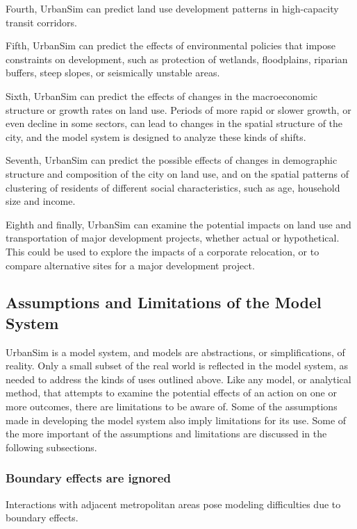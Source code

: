 Fourth, UrbanSim can predict land use development patterns in high-capacity transit corridors.

Fifth, UrbanSim can predict the effects of environmental policies that impose constraints on development, such as protection of wetlands, floodplains, riparian buffers, steep slopes, or seismically unstable areas.

Sixth, UrbanSim can predict the effects of changes in the macroeconomic structure or growth rates on land use. Periods of more rapid or slower growth, or even decline in some sectors, can lead to changes in the spatial structure of the city, and the model system is designed to analyze these kinds of shifts.

Seventh, UrbanSim can predict the possible effects of changes in demographic structure and composition of the city on land use, and on the spatial patterns of clustering of residents of different social characteristics, such as age, household size and income.

Eighth and finally, UrbanSim can examine the potential impacts on land use and transportation of major development projects, whether actual or hypothetical. This could be used to explore the impacts of a corporate relocation, or to compare alternative sites for a major development project.


\subsection{Assumptions and Limitations of the Model System}

UrbanSim is a model system, and models are abstractions, or simplifications, of reality. Only a small subset of the real world is reflected in the model system, as needed to address the kinds of uses outlined above. Like any model, or analytical method, that attempts to examine the potential effects of an action on one or more outcomes, there are limitations to be aware of. Some of the assumptions made in developing the model system also imply limitations for its use. Some of the more
important of the assumptions and limitations are discussed in the following subsections.

\subsubsection{Boundary effects are ignored}

Interactions with adjacent metropolitan areas pose
modeling difficulties due to boundary effects.

